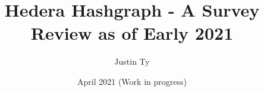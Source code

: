 \documentclass{article}
\begin{document}

\author{Justin Ty}
\title{Hedera Hashgraph - A Survey Review as of Early 2021}
\date{April 2021 (Work in progress)}

\maketitle






\printbibliography

\end{document}
